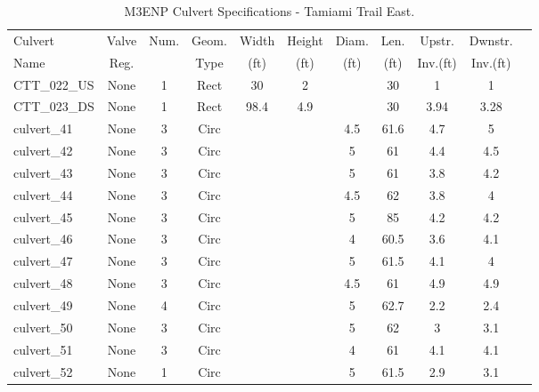 \begin{table}[]
\caption{M3ENP Culvert Specifications - Tamiami Trail East.}
\label{tab:culv-specs-CTTe}
\begin{tabular}{@{}lcccccccccc@{}}
\toprule
Culvert       & Valve      & Num.     & Geom.& Width  & Height & Diam.    & Len.   & Upstr.    & Dwnstr.    \\
Name          & Reg.       &          & Type & (ft)   & (ft)   & (ft)     & (ft)   & Inv.(ft)  & Inv.(ft)   \\
\midrule
CTT\_022\_US  & None       & 1        & Rect & 30     & 2      &          & 30     & 1         & 1          \\
CTT\_023\_DS  & None       & 1        & Rect & 98.4   & 4.9   &          & 30     & 3.94      & 3.28       \\
culvert\_41   & None       & 3        & Circ &        &       & 4.5      & 61.6   & 4.7       & 5          \\
culvert\_42   & None       & 3        & Circ &        &       & 5        & 61     & 4.4       & 4.5        \\
culvert\_43   & None       & 3        & Circ &        &       & 5        & 61     & 3.8       & 4.2        \\
culvert\_44   & None       & 3        & Circ &        &       & 4.5      & 62     & 3.8       & 4          \\
culvert\_45   & None       & 3        & Circ &        &       & 5        & 85     & 4.2       & 4.2        \\
culvert\_46   & None       & 3        & Circ &        &       & 4        & 60.5   & 3.6       & 4.1        \\
culvert\_47   & None       & 3        & Circ &        &       & 5        & 61.5   & 4.1       & 4          \\
culvert\_48   & None       & 3        & Circ &        &       & 4.5      & 61     & 4.9       & 4.9        \\
culvert\_49   & None       & 4        & Circ &        &       & 5        & 62.7   & 2.2       & 2.4        \\
culvert\_50   & None       & 3        & Circ &        &       & 5        & 62     & 3         & 3.1        \\
culvert\_51   & None       & 3        & Circ &        &       & 4        & 61     & 4.1       & 4.1        \\
culvert\_52   & None       & 1        & Circ &        &       & 5        & 61.5   & 2.9       & 3.1        \\

\end{tabular}
\end{table}
